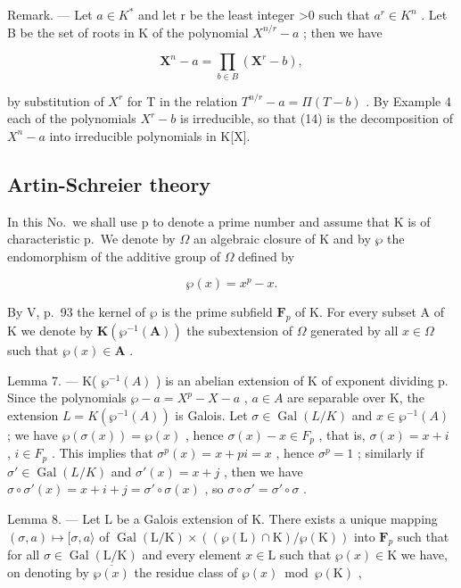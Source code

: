 Remark. --- Let \(a \in K^{*}\) and let r be the least integer \textgreater0 such that \(a^{r} \in K^{n}\) . Let B be the set of roots in K of the polynomial \(X^{n/r} - a\) ; then we have

\[
\mathbf {X} ^ {n} - a = \prod_ {b \in B} \left(\mathbf {X} ^ {r} - b\right),\tag{14}
\]

by substitution of \(X^{r}\) for T in the relation \(T^{n/r}-a=\Pi(T-b)\) . By Example 4 each of the polynomials \(X^{r}-b\) is irreducible, so that (14) is the decomposition of \(X^{n}-a\) into irreducible polynomials in K{[}X{]}.

\subsection{Artin-Schreier theory}

In this No.~we shall use p to denote a prime number and assume that K is of characteristic p.~We denote by \(\Omega\) an algebraic closure of K and by \(\wp\) the endomorphism of the additive group of \(\Omega\) defined by

\[
\wp (x) = x ^ {p} - x.
\]

By V, p.~93 the kernel of \(\wp\) is the prime subfield \(\mathbf{F}_p\) of K. For every subset A of K we denote by \(\mathbf{K}(\wp^{-1}(\mathbf{A}))\) the subextension of \(\Omega\) generated by all \(x \in \Omega\) such that \(\wp(x) \in \mathbf{A}\) .

Lemma 7. --- K( \(\wp^{-1}(A)\) ) is an abelian extension of K of exponent dividing p. Since the polynomials \(\wp - a = X^{p} - X - a\) , \(a \in A\) are separable over K, the extension \(L = K(\wp^{-1}(A))\) is Galois. Let \(\sigma \in \operatorname{Gal}(L/K)\) and \(x \in \wp^{-1}(A)\) ; we have \(\wp(\sigma(x)) = \wp(x)\) , hence \(\sigma(x) - x \in F_{p}\) , that is, \(\sigma(x) = x + i\) , \(i \in F_{p}\) . This implies that \(\sigma^{p}(x) = x + pi = x\) , hence \(\sigma^{p} = 1\) ; similarly if \(\sigma' \in \operatorname{Gal}(L/K)\) and \(\sigma'(x) = x + j\) , then we have \(\sigma \circ \sigma'(x) = x + i + j = \sigma' \circ \sigma(x)\) , so \(\sigma \circ \sigma' = \sigma' \circ \sigma\) .

Lemma 8. --- Let L be a Galois extension of K. There exists a unique mapping \((\sigma, a) \mapsto [\sigma, a\rangle\) of \(\operatorname{Gal}(\mathrm{L} / \mathrm{K}) \times ((\wp(\mathrm{L}) \cap \mathrm{K}) / \wp(\mathrm{K}))\) into \(\mathbf{F}_p\) such that for all \(\sigma \in \operatorname{Gal}(\mathrm{L} / \mathrm{K})\) and every element \(x \in \mathrm{L}\) such that \(\wp(x) \in \mathrm{K}\) we have, on denoting by \(\overline{\wp(x)}\) the residue class of \(\wp(x) \bmod \wp(\mathrm{K})\) ,

